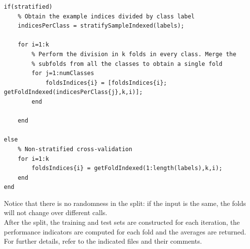 \documentclass{article}
\begin{document}
\begin{lstlisting}[firstnumber=14]
if(stratified)
    % Obtain the example indices divided by class label
    indicesPerClass = stratifySampleIndexed(labels);
    
    for i=1:k
        % Perform the division in k folds in every class. Merge the
        % subfolds from all the classes to obtain a single fold
        for j=1:numClasses
            foldsIndices{i} = [foldsIndices{i}; getFoldIndexed(indicesPerClass{j},k,i)];
        end
        
    end    
    
else
    % Non-stratified cross-validation
    for i=1:k
        foldsIndices{i} = getFoldIndexed(1:length(labels),k,i);
    end
end
\end{lstlisting}
Notice that there is no randomness in the split: if the input is the same, the folds will not change over different calls.\\
After the split, the training and test sets are constructed for each iteration, the performance indicators are computed for each fold and the averages are returned. For further details, refer to the indicated files and their comments.

\newpage
\end{document}
